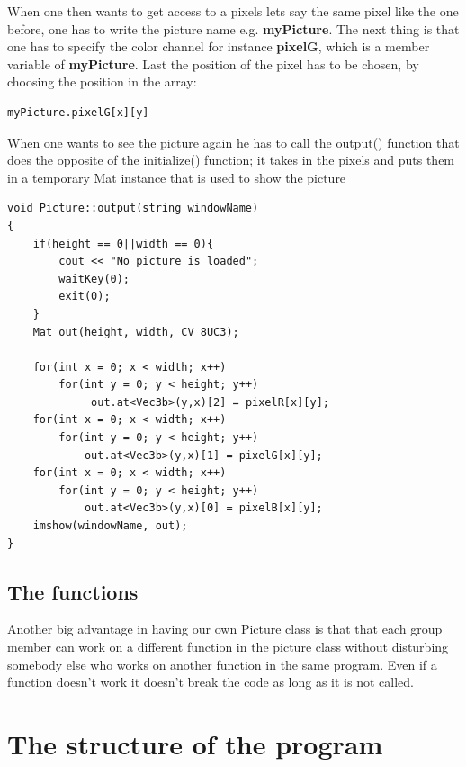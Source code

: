 When one then wants to get access to a pixels lets say the same pixel like the one before, one has to write the picture name e.g. \textbf{myPicture}. The next thing is that one has to specify the color channel for instance \textbf{pixelG}, which is a member variable of \textbf{myPicture}. Last the position of the pixel has to be chosen, by choosing the position in the array:

\begin{lstlisting}
myPicture.pixelG[x][y]
\end{lstlisting}

When one wants to see the picture again he has to call the output() function that does the opposite of the initialize() function; it takes in the pixels and puts them in a temporary Mat instance that is used to show the picture

\begin{lstlisting}
void Picture::output(string windowName)
{
	if(height == 0||width == 0){
		cout << "No picture is loaded";
		waitKey(0);
		exit(0);
	}
	Mat out(height, width, CV_8UC3);

	for(int x = 0; x < width; x++)
		for(int y = 0; y < height; y++)
			 out.at<Vec3b>(y,x)[2] = pixelR[x][y];
	for(int x = 0; x < width; x++)
		for(int y = 0; y < height; y++)
			out.at<Vec3b>(y,x)[1] = pixelG[x][y];
	for(int x = 0; x < width; x++)
		for(int y = 0; y < height; y++)
			out.at<Vec3b>(y,x)[0] = pixelB[x][y];			
	imshow(windowName, out);
}
\end{lstlisting}

\subsection{The functions}
Another big advantage in having our own Picture class is that that each group member can work on a different function in the picture class without disturbing somebody else who works on another function in the same program. Even if a function doesn't work it doesn't break the code as long as it is not called. 

\section{The structure of the program}

